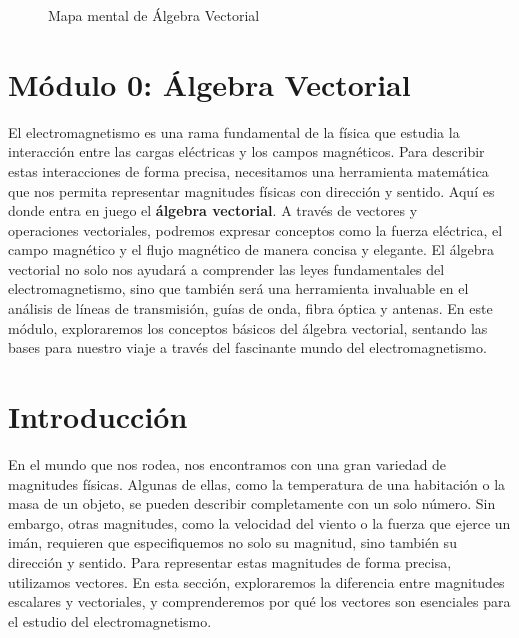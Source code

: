 \documentclass{article}
\begin{document}
\begin{figure}[H]
\caption{Mapa mental de Álgebra Vectorial}
\label{fig:mapa_mental}
\end{figure}
   
\section*{Módulo 0: Álgebra Vectorial}

El electromagnetismo es una rama fundamental de la física que estudia la interacción entre las cargas eléctricas y los campos magnéticos.  Para describir estas interacciones de forma precisa, necesitamos una herramienta matemática que nos permita representar magnitudes físicas con dirección y sentido. Aquí es donde entra en juego el \textbf{álgebra vectorial}. A través de vectores y \\operaciones vectoriales,  podremos expresar conceptos como la fuerza eléctrica, el campo magnético y el flujo magnético de manera concisa y elegante.  El álgebra vectorial no solo nos ayudará a comprender las leyes fundamentales del electromagnetismo, sino que también será una herramienta invaluable en el análisis de líneas de transmisión, guías de onda, fibra óptica y antenas.  En este módulo, exploraremos los conceptos básicos del álgebra vectorial, sentando las bases para nuestro viaje a través del fascinante mundo del electromagnetismo.

\section{Introducción}
En el mundo que nos rodea, nos encontramos con una gran variedad de magnitudes físicas.  Algunas de ellas, como la temperatura de una habitación o la masa de un objeto, se pueden describir completamente con un solo número.  Sin embargo,  otras magnitudes, como la velocidad del viento o la fuerza que ejerce un imán,  requieren que especifiquemos no solo su magnitud, sino también su dirección y sentido.  Para representar estas magnitudes de forma precisa,  utilizamos  vectores.  En esta sección,  exploraremos la diferencia entre magnitudes  escalares y  vectoriales,  y comprenderemos por qué los vectores son esenciales para el estudio del electromagnetismo.
\end{document}

